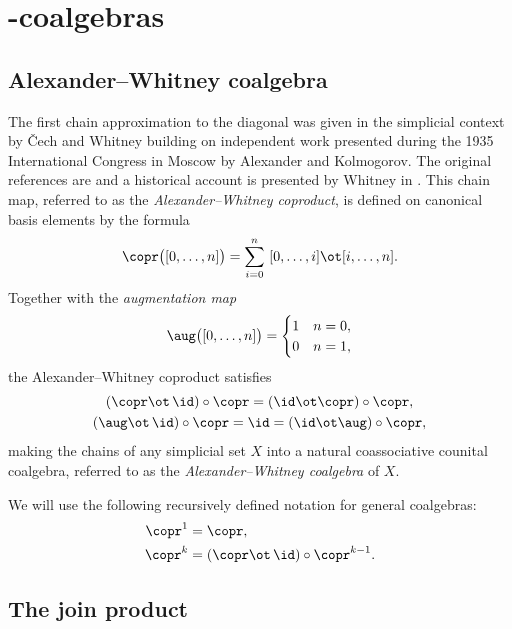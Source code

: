 
\section{\pdfEinfty-coalgebras} \label{s:integrally}


\subsection{Alexander--Whitney coalgebra} \label{ss:aw diagonal}

The first chain approximation to the diagonal was given in the simplicial context by \v{C}ech and Whitney building on independent work presented during the 1935 International Congress in Moscow by Alexander and Kolmogorov.
The original references are \cite{alexander1936ring, cech1936multiplication, whitney1938products} and a historical account is presented by Whitney in \cite[p.110]{whitney1988history}.
This chain map, referred to as the \textit{Alexander--Whitney coproduct}, is defined on canonical basis elements by the formula
\begin{equation} \label{e:alexander-whitney coalgebra}
\copr \big( [0,\dots,n] \big) = \sum_{i=0}^n \ [0, \dots, i] \ot [i, \dots, n].
\end{equation}
Together with the \textit{augmentation map}
\begin{equation} \label{e:augmentation map}
\aug \big( [0,\dots,n] \big) =
\begin{cases}
1 & n=0, \\ 0 & n=1,
\end{cases}
\end{equation}
the Alexander--Whitney coproduct satisfies
\begin{gather}
\label{e:coassociativity relation}
(\copr \ot \, \id) \circ \copr = (\id \ot \copr) \circ \copr, \\
\label{e:counital relation}
(\aug \ot \, \id) \circ \copr = \id = (\id \ot \aug) \circ \copr,
\end{gather}
making the chains of any simplicial set $X$ into a natural coassociative counital coalgebra, referred to as the \textit{Alexander--Whitney coalgebra} of $X$.

We will use the following recursively defined notation for general coalgebras:
\begin{align*}
\copr^1 &= \copr, \\
\copr^k &= (\copr \ot \, \id) \circ \copr^{k-1}.
\end{align*}

\subsection{The join product}

